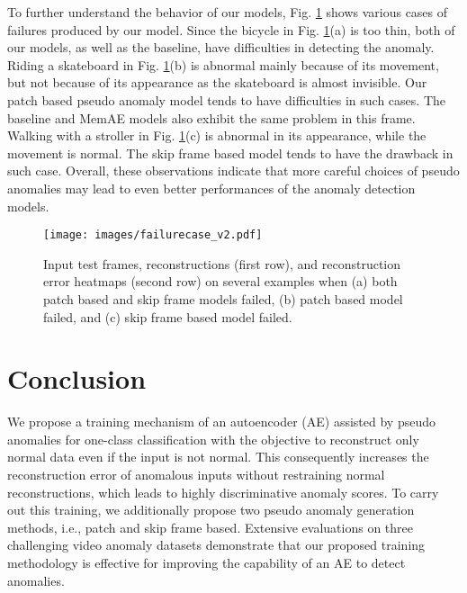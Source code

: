 \documentclass{bmvc2k}
\begin{document}
To further understand the behavior of our models, Fig. \ref{fig:failurecase} shows various cases of failures produced by our model. Since the bicycle in Fig. \ref{fig:failurecase}(a) is too thin, both of our models, as well as the baseline, have difficulties in detecting the anomaly. Riding a skateboard in Fig. \ref{fig:failurecase}(b) is abnormal mainly because of its movement, but not because of its appearance as the skateboard is almost invisible. Our patch based pseudo anomaly model tends to have difficulties in such cases. The baseline and MemAE models also exhibit the same problem in this frame. Walking with a stroller in Fig. \ref{fig:failurecase}(c) is abnormal in its appearance, while the movement is normal. The skip frame based model tends to have the drawback in such case. Overall, these observations indicate that more careful choices of pseudo anomalies may lead to even better performances of the anomaly detection models.

\begin{figure}
\begin{center}
\texttt{[image: images/failurecase\_v2.pdf]}
\end{center}
\vspace{-7mm}
  \caption{
Input test frames, reconstructions (first row), and reconstruction error heatmaps (second row) on several examples when (a) both patch based and skip frame models failed, (b) patch based model failed, and (c) skip frame based model failed.
  }
\label{fig:failurecase}
\vspace{-3mm}
\end{figure}


























\vspace{-3mm}
\section{Conclusion}
\label{sec:conclusion}

We propose a training mechanism of an autoencoder (AE) assisted by pseudo anomalies for one-class classification with the objective to reconstruct only normal data even if the input is not normal. This consequently increases the reconstruction error of anomalous inputs without restraining normal reconstructions, which leads to highly discriminative anomaly scores. 
To carry out this training, we additionally propose two pseudo anomaly generation methods, i.e., patch and skip frame based. Extensive evaluations on three challenging video anomaly datasets demonstrate that our proposed training methodology is effective for improving the capability of an AE to detect anomalies.  
\end{document}
